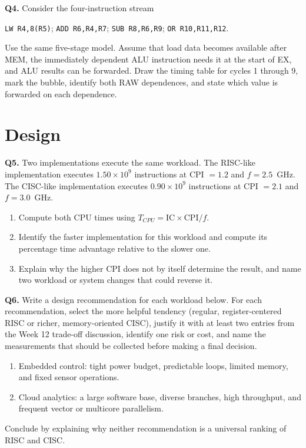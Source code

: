 \documentclass[11pt]{article}
\begin{document}
\textbf{Q4.} Consider the four-instruction stream
\begin{center}
\texttt{LW R4,8(R5)}; \quad \texttt{ADD R6,R4,R7}; \quad
\texttt{SUB R8,R6,R9}; \quad \texttt{OR R10,R11,R12}.
\end{center}
Use the same five-stage model. Assume that load data becomes available after
MEM, the immediately dependent ALU instruction needs it at the start of EX,
and ALU results can be forwarded. Draw the timing table for cycles 1 through
9, mark the bubble, identify both RAW dependences, and state which value is
forwarded on each dependence.

\section{Design}

\textbf{Q5.} Two implementations execute the same workload. The RISC-like
implementation executes $1.50\times10^9$ instructions at CPI $=1.2$ and
$f=2.5$~GHz. The CISC-like implementation executes
$0.90\times10^9$ instructions at CPI $=2.1$ and $f=3.0$~GHz.
\begin{enumerate}
  \item[(a)] Compute both CPU times using
        $T_{CPU}=\mathrm{IC}\times\mathrm{CPI}/f$.
  \item[(b)] Identify the faster implementation for this workload and compute
        its percentage time advantage relative to the slower one.
  \item[(c)] Explain why the higher CPI does not by itself determine the
        result, and name two workload or system changes that could reverse it.
\end{enumerate}

\textbf{Q6.} Write a design recommendation for each workload below. For each
recommendation, select the more helpful tendency (regular, register-centered
RISC or richer, memory-oriented CISC), justify it with at least two entries
from the Week 12 trade-off discussion, identify one risk or cost, and name the
measurements that should be collected before making a final decision.
\begin{enumerate}
  \item[(a)] Embedded control: tight power budget, predictable loops, limited
        memory, and fixed sensor operations.
  \item[(b)] Cloud analytics: a large software base, diverse branches, high
        throughput, and frequent vector or multicore parallelism.
\end{enumerate}
Conclude by explaining why neither recommendation is a universal ranking of
RISC and CISC.



\end{document}
